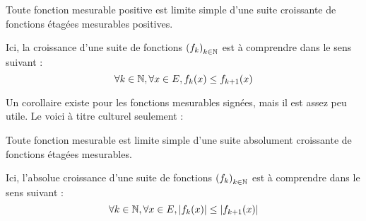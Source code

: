 \documentclass[../integ-proba.tex]{subfiles}
\begin{document}
  \begin{thm}
    \label{thm:decompmes}
    Toute fonction mesurable positive est limite simple d'une suite croissante de fonctions étagées mesurables positives.
  \end{thm}

  \begin{rem}
    Ici, la croissance d'une suite de fonctions $\left(f_k\right)_{k\in \mathbb{N}}$ est à comprendre dans le sens suivant :
    \begin{displaymath}
      \forall k \in \mathbb{N}, \forall x \in E, f_k(x) \leq f_{k+1}(x)
    \end{displaymath}
  \end{rem}

  Un corollaire existe pour les fonctions mesurables signées, mais il est assez peu utile.
  Le voici à titre culturel seulement :

  \begin{cor}
    Toute fonction mesurable est limite simple d'une suite absolument croissante de fonctions étagées mesurables.
  \end{cor}

  \begin{rem}
    Ici, l'absolue croissance d'une suite de fonctions $\left(f_k\right)_{k\in \mathbb{N}}$ est à comprendre dans le sens suivant :
    \begin{displaymath}
      \forall k \in \mathbb{N}, \forall x \in E, \left|f_k(x)\right| \leq \left|f_{k+1}(x)\right|
    \end{displaymath}
  \end{rem}
\end{document}
